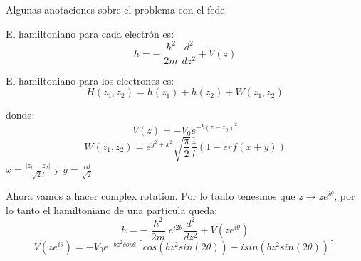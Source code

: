 \documentclass[10pt,a4paper]{article}
\begin{document}
Algunas anotaciones sobre el problema con el fede.

El hamiltoniano para cada electr\'on es:
\begin{equation}
h = -\frac{\hslash^2}{2m}\frac{d^2}{dz^2}+V(z)
\end{equation}

El hamiltoniano para los electrones es:
\begin{equation}
H(z_1, z_2)=h(z_1)+h(z_2)+W(z_1,z_2)
\end{equation}

donde:
\begin{equation}
V(z) = -V_0 e^{-b(z-z_0)^2}
\end{equation}
\begin{equation}
W(z_1,z_2) = e^{y^2+x^2} \sqrt{\frac{\pi}{2}}\frac{1}{l}(1-erf(x+y))
\end{equation}
$x = \frac{|z_1-z_2|}{\sqrt{2}l}$ y $y=\frac{\alpha l}{\sqrt{2}}$

Ahora vamos a hacer complex rotation. Por lo tanto tenesmos que $z\rightarrow ze^{i\theta}$, 
por lo tanto el hamiltoniano de una particula queda:
\begin{equation}
h = -\frac{\hslash^2}{2m} e^{i2\theta} \frac{d^2}{dz^2}+V(ze^{i\theta})
\end{equation}
\begin{equation}
V(ze^{i\theta}) =-V_0e^{-bz^2cos\theta}\left[cos(bz^2 sin(2\theta))-i sin( bz^2 sin(2\theta))\right]
\end{equation}
\end{document}
